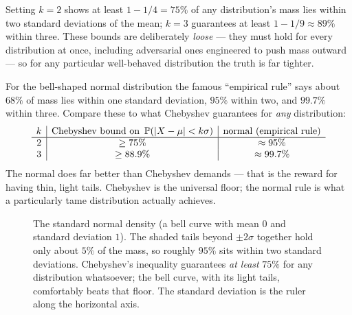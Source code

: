 Setting $k=2$ shows at least $1 - 1/4 = 75\%$ of any distribution's mass lies
within two standard deviations of the mean; $k=3$ guarantees at least
$1 - 1/9 \approx 89\%$ within three. These bounds are deliberately
\emph{loose} --- they must hold for every distribution at once, including
adversarial ones engineered to push mass outward --- so for any particular
well-behaved distribution the truth is far tighter.

\begin{example}
\label{ch09:ex-cheby-vs-normal}
For the bell-shaped normal distribution the famous ``empirical rule'' says
about $68\%$ of mass lies within one standard deviation, $95\%$ within two, and
$99.7\%$ within three. Compare these to what Chebyshev guarantees for
\emph{any} distribution:
\[
  \begin{array}{c|c|c}
    k & \text{Chebyshev bound on } \operatorname{\mathbb{P}}(\lvert X-\mu\rvert<k\sigma)
      & \text{normal (empirical rule)}\\\hline
    2 & \ge 75\%   & \approx 95\%\\
    3 & \ge 88.9\% & \approx 99.7\%
  \end{array}
\]
The normal does far better than Chebyshev demands --- that is the reward for
having thin, light tails. Chebyshev is the universal floor; the normal rule is
what a particularly tame distribution actually achieves.
\end{example}

\begin{figure}[H]
\centering
{}
\caption{The standard normal density (a bell curve with mean $0$ and standard deviation $1$). The shaded tails beyond $\pm 2\sigma$
together hold only about $5\%$ of the mass, so roughly $95\%$ sits within two
standard deviations. Chebyshev's inequality guarantees \emph{at least} $75\%$
for any distribution whatsoever; the bell curve, with its light tails,
comfortably beats that floor. The standard deviation is the ruler along the
horizontal axis.}
\label{ch09:fig-bell}
\end{figure}

